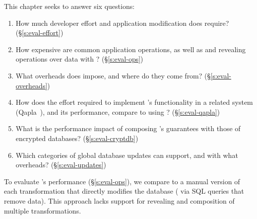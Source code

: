 This chapter seeks to answer six questions:
%
\begin{enumerate}[nosep]
 \item How much developer effort and application modification does \sys require? (\S\ref{s:eval-effort})
%
\item How expensive are common application operations, as well as
  \xxing and revealing operations over \xxed data with \sys? (\S\ref{s:eval-ops})

\item What overheads does \sys impose, and where do they come from?
    (\S\ref{s:eval-overheads})

\item 
    How does the effort required to implement \sys's
    functionality in a related system (Qapla~\cite{qapla}),
    and its performance, compare to using \sys?
    (\S\ref{s:eval-qapla})

\item 
    What is the performance impact of composing \sys's guarantees
    with those of encrypted databases?
        (\S\ref{s:eval-cryptdb})

\item 
    Which categories of global database updates can \sys
        support, and with what overheads? (\S\ref{s:eval-updates})
%
\end{enumerate}

To evaluate \sys's performance (\S\ref{s:eval-ops}), we compare \sys to a manual
version of each \xxing transformation that directly modifies the database (\eg
via SQL queries that remove data). This approach lacks support for revealing and
composition of multiple transformations. 

%

%
%
%
%

